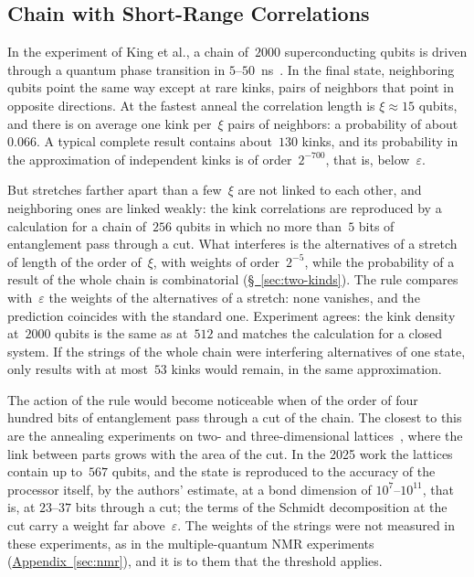 \documentclass[11pt,a4paper]{article}
\begin{document}
\subsection{Chain with Short-Range Correlations}
\label{sec:chain}

In the experiment of King et al., a chain of~$2000$ superconducting qubits is driven through a quantum phase transition in $5$--$50$~ns~\cite{king2022}. In the final state, neighboring qubits point the same way except at rare kinks, pairs of neighbors that point in opposite directions. At the fastest anneal the correlation length is $\xi\approx15$ qubits, and there is on average one kink per~$\xi$ pairs of neighbors: a probability of about~$0.066$. A typical complete result contains about~$130$ kinks, and its probability in the approximation of independent kinks is of order~$2^{-700}$, that is, below~$\varepsilon$.

But stretches farther apart than a few~$\xi$ are not linked to each other, and neighboring ones are linked weakly: the kink correlations are reproduced by a calculation for a chain of~$256$ qubits in which no more than~$5$ bits of entanglement pass through a cut. What interferes is the alternatives of a stretch of length of the order of~$\xi$, with weights of order~$2^{-5}$, while the probability of a result of the whole chain is combinatorial (\hyperref[sec:two-kinds]{\S~\ref*{sec:two-kinds}}). The rule compares with~$\varepsilon$ the weights of the alternatives of a stretch: none vanishes, and the prediction coincides with the standard one. Experiment agrees: the kink density at~$2000$ qubits is the same as at~$512$ and matches the calculation for a closed system. If the strings of the whole chain were interfering alternatives of one state, only results with at most~$53$ kinks would remain, in the same approximation.

The action of the rule would become noticeable when of the order of four hundred bits of entanglement pass through a cut of the chain. The closest to this are the annealing experiments on two- and three-dimensional lattices~\cite{king2023,king2025}, where the link between parts grows with the area of the cut. In the 2025 work the lattices contain up to~$567$ qubits, and the state is reproduced to the accuracy of the processor itself, by the authors' estimate, at a bond dimension of $10^{7}$--$10^{11}$, that is, at $23$--$37$ bits through a cut; the terms of the Schmidt decomposition at the cut carry a weight far above~$\varepsilon$. The weights of the strings were not measured in these experiments, as in the multiple-quantum NMR experiments (\hyperref[sec:nmr]{Appendix~\ref*{sec:nmr}}), and it is to them that the threshold applies.
\end{document}
